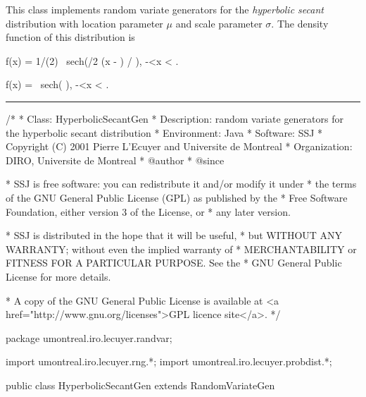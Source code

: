 
This class implements random variate generators for the 
 {\em hyperbolic secant\/} distribution with location
 parameter $\mu$ and scale parameter $\sigma$.
The density function of this distribution is
\begin{htmlonly}
\eq
   f(x) = 1/(2\sigma) \mbox{ sech}(\pi/2 (x - \mu) / \sigma),
   \qquad -\infty <x < \infty.
\endeq
\end{htmlonly}%
\begin{latexonly}%
\eq
   f(x) =  \mbox{ sech}\left( \right),  \qquad -\infty <x < \infty.
\endeq
\end{latexonly}%

\bigskip\hrule

\begin{code}
\begin{hide}
/*
 * Class:        HyperbolicSecantGen
 * Description:  random variate generators for the hyperbolic secant distribution
 * Environment:  Java
 * Software:     SSJ 
 * Copyright (C) 2001  Pierre L'Ecuyer and Universite de Montreal
 * Organization: DIRO, Universite de Montreal
 * @author       
 * @since

 * SSJ is free software: you can redistribute it and/or modify it under
 * the terms of the GNU General Public License (GPL) as published by the
 * Free Software Foundation, either version 3 of the License, or
 * any later version.

 * SSJ is distributed in the hope that it will be useful,
 * but WITHOUT ANY WARRANTY; without even the implied warranty of
 * MERCHANTABILITY or FITNESS FOR A PARTICULAR PURPOSE.  See the
 * GNU General Public License for more details.

 * A copy of the GNU General Public License is available at
   <a href="http://www.gnu.org/licenses">GPL licence site</a>.
 */
\end{hide}
package umontreal.iro.lecuyer.randvar;\begin{hide}
import umontreal.iro.lecuyer.rng.*;
import umontreal.iro.lecuyer.probdist.*;
\end{hide}

public class HyperbolicSecantGen extends RandomVariateGen \begin{hide} {
   protected double mu;
   protected double sigma;

\end{hide}
\end{code}


